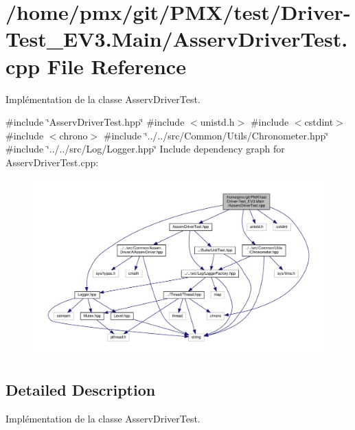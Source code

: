 \hypertarget{Driver-Test__EV3_8Main_2AsservDriverTest_8cpp}{}\section{/home/pmx/git/\+P\+M\+X/test/\+Driver-\/\+Test\+\_\+\+E\+V3.Main/\+Asserv\+Driver\+Test.cpp File Reference}
\label{Driver-Test__EV3_8Main_2AsservDriverTest_8cpp}


Implémentation de la classe Asserv\+Driver\+Test.  


{\ttfamily \#include \char`\"{}Asserv\+Driver\+Test.\+hpp\char`\"{}}\newline
{\ttfamily \#include $<$unistd.\+h$>$}\newline
{\ttfamily \#include $<$cstdint$>$}\newline
{\ttfamily \#include $<$chrono$>$}\newline
{\ttfamily \#include \char`\"{}../../src/\+Common/\+Utils/\+Chronometer.\+hpp\char`\"{}}\newline
{\ttfamily \#include \char`\"{}../../src/\+Log/\+Logger.\+hpp\char`\"{}}\newline
Include dependency graph for Asserv\+Driver\+Test.\+cpp\+:
\nopagebreak
\begin{figure}[H]
\begin{center}
\leavevmode
\includegraphics[width=350pt]{Driver-Test__EV3_8Main_2AsservDriverTest_8cpp__incl}
\end{center}
\end{figure}


\subsection{Detailed Description}
Implémentation de la classe Asserv\+Driver\+Test. 

